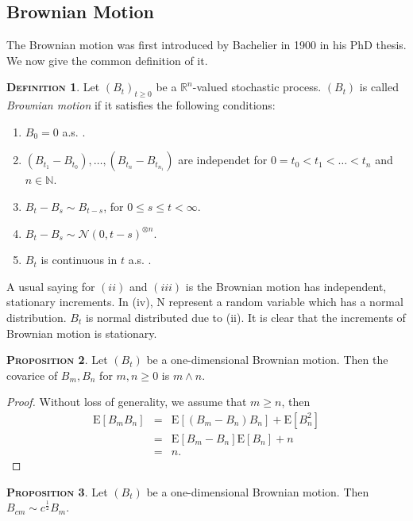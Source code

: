 \documentclass[a4paper, twoside, 11pt]{article}
\theoremstyle{definition}
\newtheorem{definition}{\scshape Definition}[section]
\newtheorem{proposition}[definition]{\scshape Proposition}
\begin{document}
\subsection{Brownian Motion}
The Brownian motion was first introduced by Bachelier in 1900 in his PhD thesis. We now give the common definition of it.
\begin{definition}
Let $(B_t)_{t\ge0}$ be a $\mathbb{R}^{n}$-valued stochastic process. $(B_t)$ is called \emph{Brownian motion} if it satisfies the following conditions:
\begin{enumerate}[topsep=0pt, itemsep=-1ex, partopsep=1ex, parsep=1ex, label=(\roman*)]
  \item $B_0 = 0 $ a.s. .
  \item $(B_{t_1} - B_{t_0}),\dots,(B_{t_n} - B_{t_{n_1}})$ are independet for $0=t_0<t_1<\dots<t_n$ and $n \in \mathbb{N}$.
  \item $B_t - B_s \sim B_{t-s}$, for $0 \le s \le t < \infty$.
  \item $B_t - B_s \sim \mathcal{N}(0, t-s)^{\otimes n}$.
  \item $B_t$ is continuous in $t$ a.s. .
\end{enumerate}
\end{definition}
A usual saying for $(ii)$ and $(iii)$ is the Brownian motion has independent, stationary increments. In (iv), $\mathrm{N}$ represent a random variable which has a normal distribution. $B_t$ is normal distributed due to (ii). It is clear that the increments of Brownian motion is stationary.

\begin{proposition}
  Let $(B_t)$ be a one-dimensional Brownian motion. Then the covarice of $B_m, B_n$ for $m, n \ge 0$ is $m \wedge n $.
\end{proposition}

\begin{proof}
  Without loss of generality, we assume that $m \ge n$, then
  \begin{eqnarray*}
	\mathrm{E}[B_mB_n] &=& \mathrm{E}[(B_m - B_n)B_n] + \mathrm{E}[B_n^2]\\
	&=& \mathrm{E}[B_m - B_n]\mathrm{E}[B_n] + n\\
	&=& n .
  \end{eqnarray*}
  \label{sec:cor}
\end{proof}

\begin{proposition}
  Let $(B_t)$ be a one-dimensional Brownian motion. Then $B_{cm} \sim c^{\frac{1}{2}}B_m$.
\end{proposition}
\end{document}
